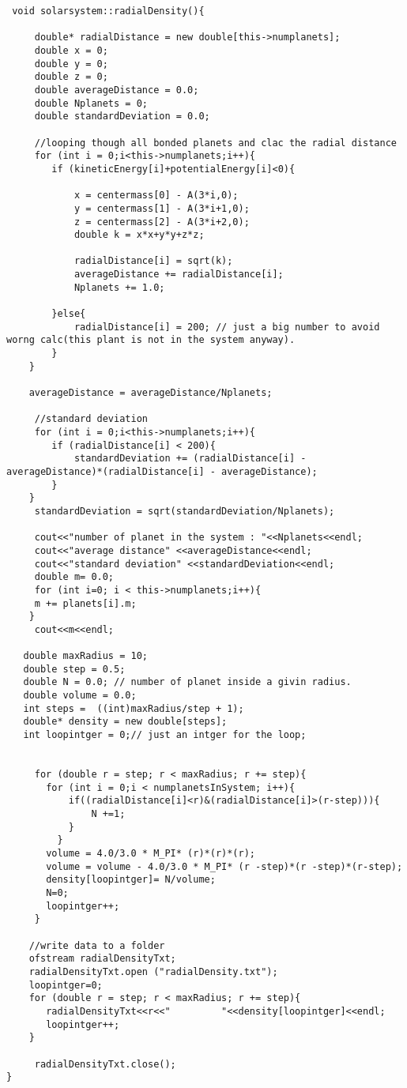 \documentclass[10pt,a4paper]{article}
\begin{document}
 \begin{lstlisting}
 void solarsystem::radialDensity(){

     double* radialDistance = new double[this->numplanets];
     double x = 0;
     double y = 0;
     double z = 0;
     double averageDistance = 0.0;
     double Nplanets = 0;
     double standardDeviation = 0.0;

     //looping though all bonded planets and clac the radial distance
     for (int i = 0;i<this->numplanets;i++){
        if (kineticEnergy[i]+potentialEnergy[i]<0){

            x = centermass[0] - A(3*i,0);
            y = centermass[1] - A(3*i+1,0);
            z = centermass[2] - A(3*i+2,0);
            double k = x*x+y*y+z*z;

            radialDistance[i] = sqrt(k);
            averageDistance += radialDistance[i];
            Nplanets += 1.0;

        }else{
            radialDistance[i] = 200; // just a big number to avoid worng calc(this plant is not in the system anyway).
        }
    }

    averageDistance = averageDistance/Nplanets;

     //standard deviation
     for (int i = 0;i<this->numplanets;i++){
        if (radialDistance[i] < 200){
            standardDeviation += (radialDistance[i] - averageDistance)*(radialDistance[i] - averageDistance);
        }
    }
     standardDeviation = sqrt(standardDeviation/Nplanets);

     cout<<"number of planet in the system : "<<Nplanets<<endl;
     cout<<"average distance" <<averageDistance<<endl;
     cout<<"standard deviation" <<standardDeviation<<endl;
     double m= 0.0;
     for (int i=0; i < this->numplanets;i++){
     m += planets[i].m;
    }
     cout<<m<<endl;

   double maxRadius = 10;
   double step = 0.5;
   double N = 0.0; // number of planet inside a givin radius.
   double volume = 0.0;
   int steps =  ((int)maxRadius/step + 1);
   double* density = new double[steps];
   int loopintger = 0;// just an intger for the loop;


     for (double r = step; r < maxRadius; r += step){
       for (int i = 0;i < numplanetsInSystem; i++){
           if((radialDistance[i]<r)&(radialDistance[i]>(r-step))){
               N +=1;
           }
         }
       volume = 4.0/3.0 * M_PI* (r)*(r)*(r);
       volume = volume - 4.0/3.0 * M_PI* (r -step)*(r -step)*(r-step);
       density[loopintger]= N/volume;
       N=0;
       loopintger++;
     }

    //write data to a folder
    ofstream radialDensityTxt;
    radialDensityTxt.open ("radialDensity.txt");
    loopintger=0;
    for (double r = step; r < maxRadius; r += step){
       radialDensityTxt<<r<<"         "<<density[loopintger]<<endl;
       loopintger++;
    }

     radialDensityTxt.close();
}
  \end{lstlisting}
  
\end{document}
